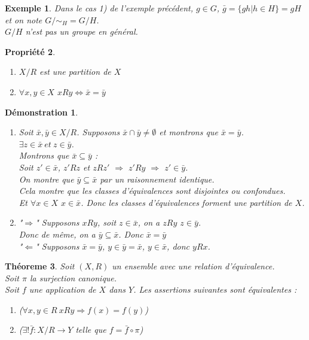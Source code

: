 \documentclass[a4paper, oneside]{report}
\theoremstyle{break}
\newtheorem{thm}{Théoreme}[section] %
\newtheorem{propr}[thm]{Propriété}
\newtheorem{exem}[thm]{Exemple}
\newtheorem*{demo}{Démonstration}
\begin{document}
\begin{exem}
	Dans le cas 1) de l'exemple précédent, $g\in G$, $\bar{g}=\{gh|h\in H \}=gH$ et on note $G/\sim_H=G/H$.\\
	$G/H$ n'est pas un groupe en général.
\end{exem}

\begin{propr}
	\begin{enumerate}
		\item $X/R$ est une partition de $X$
		\item $\forall x,y\in X$ $xRy\Leftrightarrow \bar{x}=\bar{y}$
	\end{enumerate}
\end{propr}

\begin{demo}
	\begin{enumerate}
		\item Soit $\bar{x},\bar{y}\in X/R$. Supposons $\bar{x}\cap \bar{y}\neq \emptyset$ et montrons que $\bar{x}=\bar{y}$.\\
		$\exists z\in \bar{x}~et~z\in \bar{y}$.\\
		Montrons que $\bar{x}\subseteq \bar{y}$ :\\
		Soit $z'\in \bar{x}$, $z'Rz$ et $zRz'$ $\Rightarrow$ $z'Ry$ $\Rightarrow$ $z'\in \bar{y}$.\\
		On montre que $\bar{y}\subseteq \bar{x}$ par un raisonnement identique.\\
		Cela montre que les classes d'équivalences sont disjointes ou confondues.\\
		Et $\forall x\in X$ $x\in \bar{x}$. Donc les classes d'équivalences forment une partition de $X$.\\
		
		\item "$\Rightarrow$" Supposons $xRy$, soit $z\in \bar{x}$, on a $ zRy$ $z\in \bar{y}$.\\
		Donc de même, on a $\bar{y}\subseteq \bar{x}$. Donc $\bar{x}=\bar{y}$\\
		"$\Leftarrow$" Supposons $\bar{x}=\bar{y}$, $y\in \bar{y}=\bar{x}$, $y\in \bar{x}$, donc $yRx$.
	\end{enumerate}
\end{demo}

\begin{thm}
	Soit $(X,R)$ un ensemble avec une relation d'équivalence.\\
	Soit $\pi$ la surjection canonique.\\
	Soit $f$ une application de $X$ dans $Y$. Les assertions suivantes sont équivalentes :
	\begin{enumerate}
		\item ($\forall x,y \in R~xRy\Rightarrow f(x)=f(y)$) \label{tst}
		\item ($\exists ! \bar{f}: X/R \rightarrow Y$ telle que $f=\bar{f}\circ \pi$)
	\end{enumerate}
\end{thm}
\end{document}
